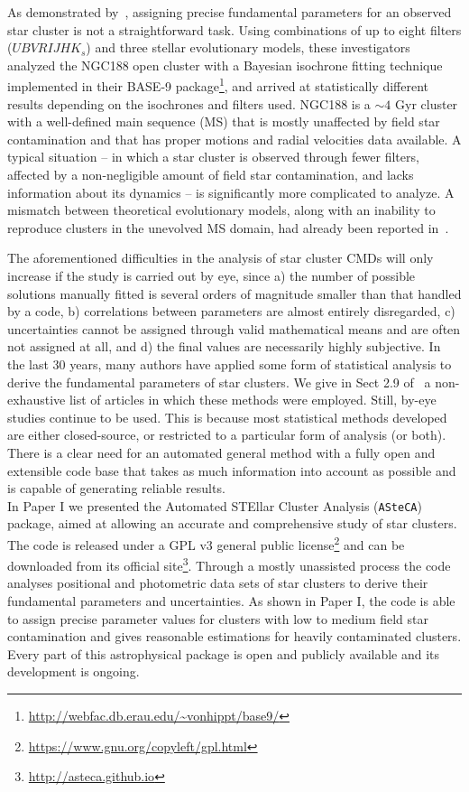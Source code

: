 \documentclass{aa}
\begin{document}
As demonstrated by~\cite{Hills_2015}, assigning precise fundamental
parameters for an observed star cluster is not a straightforward task.
Using combinations of up to eight filters ($UBVRIJHK_s$) and three stellar
evolutionary models, these investigators analyzed the NGC188 open cluster with a
Bayesian isochrone fitting technique implemented in their 
BASE-9 package\footnote{\url{http://webfac.db.erau.edu/~vonhippt/base9/}}, and
arrived at statistically different results depending on the isochrones and filters used.
%
NGC188 is a ${\sim}4$ Gyr cluster with a well-defined main sequence (MS) that is mostly
unaffected by field star contamination and that has proper motions and radial
velocities data available.
A typical situation -- in which a star cluster is observed through fewer
filters, affected by a non-negligible amount of field star contamination, and
lacks information about its dynamics -- is significantly more
complicated to analyze.
%
A mismatch between theoretical evolutionary models, along with an
inability to reproduce clusters in the unevolved MS domain, had already
been reported in~\cite{Grocholski_2003}.

The aforementioned difficulties in the analysis of star cluster CMDs will only
increase if the study is carried out by eye, since a) the number of possible solutions
manually fitted is several orders of magnitude smaller than that handled by a
code, b) correlations between parameters are almost entirely disregarded, c)
uncertainties cannot be assigned through valid mathematical
means and are often not assigned at \mbox{all,} and d) the final values
are necessarily highly subjective.
%
In the last 30 years, many authors have applied some form of
statistical analysis to derive the fundamental parameters of star clusters.
We give in Sect 2.9 of~\citet[][hereafter Paper I]{Perren_2015} a non-exhaustive
list of articles in which these methods were employed.
%
Still, by-eye studies continue to be used. This is because most statistical
methods developed are either closed-source, or restricted to a particular form
of analysis (or both).
%
There is a clear need for an automated general method with a fully open
and extensible code base that takes as much information into account as
possible and is capable of generating reliable results.\\

In Paper I we presented the Automated STEllar Cluster Analysis
(\texttt{ASteCA}) package, aimed at allowing an accurate and comprehensive study
of star clusters.
The code is released under a GPL v3 general public
license\footnote{\url{https://www.gnu.org/copyleft/gpl.html}} and
can be downloaded from its official
site\footnote{\url{http://asteca.github.io}}.
%
Through a mostly unassisted process the code analyses positional and photometric
data sets of star clusters to derive their fundamental parameters and
uncertainties.
As shown in Paper I, the code is able to assign precise parameter values for
clusters with low to medium field star contamination and gives reasonable
estimations for heavily contaminated clusters. Every part of this astrophysical
package is open and publicly available and its development is ongoing.
\end{document}
